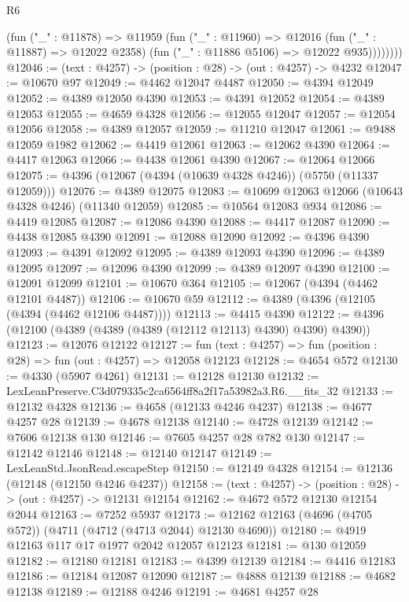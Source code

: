 \begin{lexlean}{R6}
\begin{coremodule}
              (fun ("_" : @11878) =>
              @11959
                (fun ("_" : @11960) =>
                @12016
                  (fun ("_" : @11887) => @12022 @2358)
                  (fun ("_" : @11886 @5106) => @12022 @935))))))))
@12046 := (text : @4257) -> (position : @28) -> (out : @4257) -> @4232
@12047 := @10670 @97
@12049 := @4462 @12047 @4487
@12050 := @4394 @12049
@12052 := @4389 @12050 @4390
@12053 := @4391 @12052
@12054 := @4389 @12053
@12055 := @4659 @4328
@12056 := @12055 @12047
@12057 := @12054 @12056
@12058 := @4389 @12057
@12059 := @11210 @12047
@12061 := @9488 @12059 @1982
@12062 := @4419 @12061
@12063 := @12062 @4390
@12064 := @4417 @12063
@12066 := @4438 @12061 @4390
@12067 := @12064 @12066
@12075 := @4396 (@12067 (@4394 (@10639 @4328 @4246)) (@5750 (@11337 @12059)))
@12076 := @4389 @12075
@12083 := @10699 @12063 @12066 (@10643 @4328 @4246) (@11340 @12059)
@12085 := @10564 @12083 @934
@12086 := @4419 @12085
@12087 := @12086 @4390
@12088 := @4417 @12087
@12090 := @4438 @12085 @4390
@12091 := @12088 @12090
@12092 := @4396 @4390
@12093 := @4391 @12092
@12095 := @4389 @12093 @4390
@12096 := @4389 @12095
@12097 := @12096 @4390
@12099 := @4389 @12097 @4390
@12100 := @12091 @12099
@12101 := @10670 @364
@12105 := @12067 (@4394 (@4462 @12101 @4487))
@12106 := @10670 @59
@12112 := @4389 (@4396 (@12105 (@4394 (@4462 @12106 @4487))))
@12113 := @4415 @4390
@12122 := @4396 (@12100 (@4389 (@4389 (@4389 (@12112 @12113) @4390) @4390) @4390))
@12123 := @12076 @12122
@12127 := fun (text : @4257) => fun (position : @28) => fun (out : @4257) => @12058 @12123
@12128 := @4654 @572
@12130 := @4330 (@5907 @4261)
@12131 := @12128 @12130
@12132 := LexLeanPreserve.C3d079335c2ca6564ff8a2f17a53982a3.R6.__fits_32
@12133 := @12132 @4328
@12136 := @4658 (@12133 @4246 @4237)
@12138 := @4677 @4257 @28
@12139 := @4678 @12138
@12140 := @4728 @12139
@12142 := @7606 @12138 @130
@12146 := @7605 @4257 @28 @782 @130
@12147 := @12142 @12146
@12148 := @12140 @12147
@12149 := LexLeanStd.JsonRead.escapeStep
@12150 := @12149 @4328
@12154 := @12136 (@12148 (@12150 @4246 @4237))
@12158 := (text : @4257) -> (position : @28) -> (out : @4257) -> @12131 @12154
@12162 := @4672 @572 @12130 @12154 @2044
@12163 := @7252 @5937
@12173 := @12162 @12163 (@4696 (@4705 @572)) (@4711 (@4712 (@4713 @2044) @12130 @4690))
@12180 := @4919 @12163 @117 @17 @1977 @2042 @12057 @12123
@12181 := @130 @12059
@12182 := @12180 @12181
@12183 := @4399 @12139
@12184 := @4416 @12183
@12186 := @12184 @12087 @12090
@12187 := @4888 @12139
@12188 := @4682 @12138
@12189 := @12188 @4246
@12191 := @4681 @4257 @28

\end{coremodule}
\end{lexlean}
